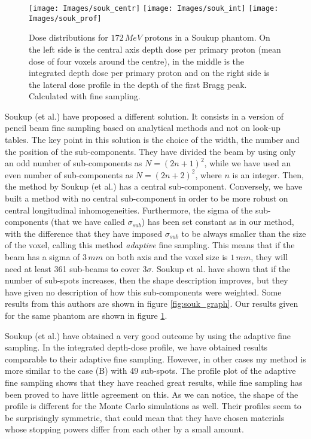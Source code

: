 \documentclass[12pt, a4paper, twoside]{book}
\begin{document}
\begin{figure}[!t]
\centering
{\texttt{[image: Images/souk\_centr]}} 
{\texttt{[image: Images/souk\_int]}} 
{\texttt{[image: Images/souk\_prof]}} 
\caption{Dose distributions for $172\,MeV$ protons in a Soukup phantom. On the left
side is the central axis depth dose per primary proton (mean dose of four voxels around the centre), in the middle is the integrated depth dose per primary proton and on the right side is the lateral dose profile in the depth of the first Bragg peak. Calculated with fine sampling.}
\label{fig:souk_fs}
\end{figure}


Soukup (et al.) \cite{souk:pba} have proposed a different solution. It consists in a version of pencil beam fine sampling based on analytical methods and not on look-up tables. The key point in this solution is the choice of the width, the number and the position of the sub-components. They have divided the beam by using only an odd number of sub-components as $N=(2n+1)^2$, while we have used an even number of sub-components as $N=(2n+2)^2$, where $n$ is an integer. Then, the method by Soukup (et al.) has a central sub-component. Conversely, we have built a method with no central sub-component in order to be more robust on central longitudinal inhomogeneities. Furthermore, the sigma of the sub-components (that we have called $\sigma_{sub}$) has been set constant as in our method, with the difference that they have imposed $\sigma_{sub}$ to be always smaller than the size of the voxel, calling this method \emph{adaptive} fine sampling. This means that if the beam has a sigma of $3\,mm$ on both axis and the voxel size is $1\,mm$, they will need at least 361 sub-beams to cover $3\sigma$. Soukup et al. have shown that if the number of sub-spots increases, then the shape description improves, but they have given no description of how this sub-components were weighted.
Some results from this authors are shown in figure \ref{fig:souk_graph}. Our results given for the same phantom are shown in figure \ref{fig:souk_fs}.

Soukup (et al.) have obtained a very good outcome by using the adaptive fine sampling. In the integrated depth-dose profile, we have obtained results comparable to their adaptive fine sampling. However, in other cases my method is more similar to the case (B) with 49 sub-spots. The profile plot of the adaptive fine sampling shows that they have reached great results, while fine sampling has been proved to have little agreement on this. As we can notice, the shape of the profile is different for the Monte Carlo simulations as well. Their profiles seem to be surprisingly symmetric, that could mean that they have chosen materials whose stopping powers differ from each other by a small amount. 
\end{document}
